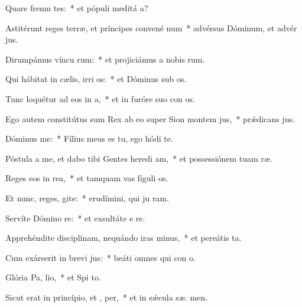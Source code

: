 \item Quare fremu tes:~* et pópuli meditá  a?
\item Astitérunt reges terræ, et príncipes convené  num~* advérsus Dóminum, et advér  jus.
\item Dirumpámus víncu rum:~* et projiciámus a nobis  rum.
\item Qui hábitat in cælis, irri os:~* et Dóminus sub os.
\item Tunc loquétur ad eos in  a,~* et in furóre suo con os.
\item Ego autem constitútus sum Rex ab eo super Sion montem  jus,~* prǽdicans  jus.
\item Dóminus   me:~* Fílius meus es tu, ego hódi  te.
\item Póstula a me, et dabo tibi Gentes heredi am,~* et possessiónem tuam  ræ.
\item Reges eos in  rea,~* et tamquam vas fíguli  os.
\item Et nunc, reges, gite:~* erudímini, qui ju ram.
\item Servíte Dómino  re:~* et exsultáte e  re.
\item Apprehéndite disciplínam, nequándo iras minus,~* et pereátis   ta.
\item Cum exárserit in brevi  jus:~* beáti omnes qui con  o.
\item Glória Pa,  lio,~* et Spi to.
\item Sicut erat in princípio, et ,  per,~* et in sǽcula sæ. men.
